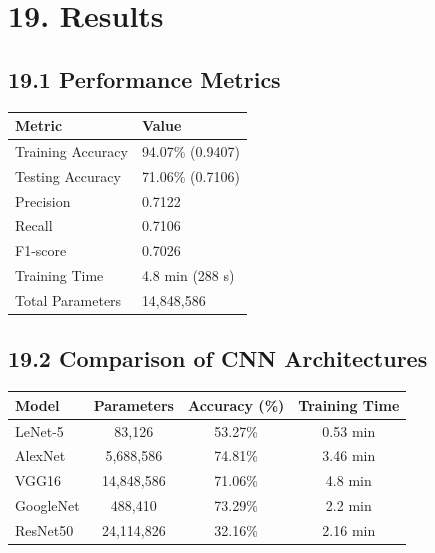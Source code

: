 \documentclass[11pt]{article}
\begin{document}

\section*{19. Results}

\subsection*{19.1 Performance Metrics}

\begin{center}
\begin{tabular}{|p{5cm}|p{4cm}|}
\hline
\textbf{Metric} & \textbf{Value} \\
\hline
Training Accuracy & 94.07\% (0.9407) \\
\hline
Testing Accuracy & 71.06\% (0.7106) \\
\hline
Precision & 0.7122 \\
\hline
Recall & 0.7106 \\
\hline
F1-score & 0.7026 \\
\hline
Training Time & 4.8 min (288 s) \\
\hline
Total Parameters & 14,848,586 \\
\hline
\end{tabular}
\end{center}

\vspace{5mm}

\subsection*{19.2 Comparison of CNN Architectures}

\begin{center}
\begin{tabular}{|l|c|c|c|}
\hline
\textbf{Model} & \textbf{Parameters} & \textbf{Accuracy (\%)} & \textbf{Training Time} \\
\hline
LeNet-5 & 83,126 & 53.27\% & 0.53 min \\
\hline
AlexNet & 5,688,586 & 74.81\% & 3.46 min \\
\hline
VGG16 & 14,848,586 & 71.06\% & 4.8 min \\
\hline
GoogleNet & 488,410 & 73.29\% & 2.2 min \\
\hline
ResNet50 & 24,114,826 & 32.16\% & 2.16 min \\
\hline
\end{tabular}
\end{center}
\end{document}
